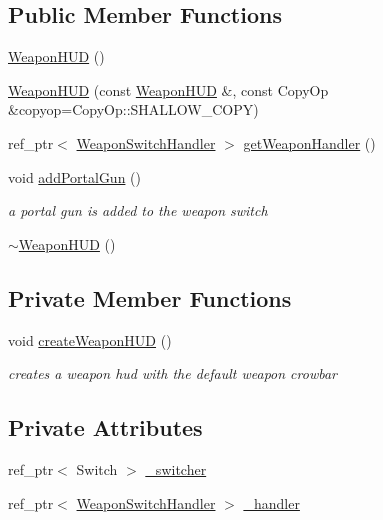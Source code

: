 \subsection*{Public Member Functions}
\begin{DoxyCompactItemize}
\item 
\hyperlink{classbrtr_1_1_weapon_h_u_d_a8bc53d9bc7df80c28e2d9eeeed113281}{Weapon\+H\+U\+D} ()
\item 
\hyperlink{classbrtr_1_1_weapon_h_u_d_a79723105b944c088928741a620551d8d}{Weapon\+H\+U\+D} (const \hyperlink{classbrtr_1_1_weapon_h_u_d}{Weapon\+H\+U\+D} \&, const Copy\+Op \&copyop=Copy\+Op\+::\+S\+H\+A\+L\+L\+O\+W\+\_\+\+C\+O\+P\+Y)
\item 
ref\+\_\+ptr$<$ \hyperlink{classbrtr_1_1_weapon_h_u_d_1_1_weapon_switch_handler}{Weapon\+Switch\+Handler} $>$ \hyperlink{classbrtr_1_1_weapon_h_u_d_a6a9a434ff3aa3861caf030763772ac74}{get\+Weapon\+Handler} ()
\item 
void \hyperlink{classbrtr_1_1_weapon_h_u_d_ab8ccf2821f698af567b7ce40eb6840d8}{add\+Portal\+Gun} ()
\begin{DoxyCompactList}\small\item\em a portal gun is added to the weapon switch \end{DoxyCompactList}\item 
\hyperlink{classbrtr_1_1_weapon_h_u_d_aaaa6c5e92034b7efb6194032f6ffca0f}{$\sim$\+Weapon\+H\+U\+D} ()
\end{DoxyCompactItemize}
\subsection*{Private Member Functions}
\begin{DoxyCompactItemize}
\item 
void \hyperlink{classbrtr_1_1_weapon_h_u_d_a86191d6e9041afc84575e77576464da9}{create\+Weapon\+H\+U\+D} ()
\begin{DoxyCompactList}\small\item\em creates a weapon hud with the default weapon crowbar \end{DoxyCompactList}\end{DoxyCompactItemize}
\subsection*{Private Attributes}
\begin{DoxyCompactItemize}
\item 
ref\+\_\+ptr$<$ Switch $>$ \hyperlink{classbrtr_1_1_weapon_h_u_d_a32d5e498c15faa87f3bcfa83ca6c5b0e}{\+\_\+switcher}
\item 
ref\+\_\+ptr$<$ \hyperlink{classbrtr_1_1_weapon_h_u_d_1_1_weapon_switch_handler}{Weapon\+Switch\+Handler} $>$ \hyperlink{classbrtr_1_1_weapon_h_u_d_a4ebf9d9e600e3a6b9f5d8601c084ee51}{\+\_\+handler}
\end{DoxyCompactItemize}


